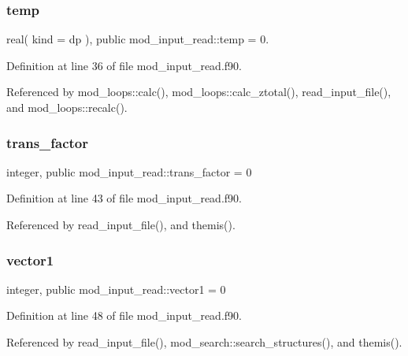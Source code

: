 \subsubsection{\texorpdfstring{temp}{temp}}
{\footnotesize\ttfamily real( kind = dp ), public mod\+\_\+input\+\_\+read\+::temp = 0.}



Definition at line 36 of file mod\+\_\+input\+\_\+read.\+f90.



Referenced by mod\+\_\+loops\+::calc(), mod\+\_\+loops\+::calc\+\_\+ztotal(), read\+\_\+input\+\_\+file(), and mod\+\_\+loops\+::recalc().

\mbox{\label{namespacemod__input__read_ae958873dff0867f0aa04dbf6cd8a1166}} 
\subsubsection{\texorpdfstring{trans\+\_\+factor}{trans\_factor}}
{\footnotesize\ttfamily integer, public mod\+\_\+input\+\_\+read\+::trans\+\_\+factor = 0}



Definition at line 43 of file mod\+\_\+input\+\_\+read.\+f90.



Referenced by read\+\_\+input\+\_\+file(), and themis().

\mbox{\label{namespacemod__input__read_a6e68357b53efca593488929b4554838d}} 
\subsubsection{\texorpdfstring{vector1}{vector1}}
{\footnotesize\ttfamily integer, public mod\+\_\+input\+\_\+read\+::vector1 = 0}



Definition at line 48 of file mod\+\_\+input\+\_\+read.\+f90.



Referenced by read\+\_\+input\+\_\+file(), mod\+\_\+search\+::search\+\_\+structures(), and themis().

